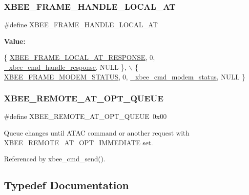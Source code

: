 \subsubsection{\texorpdfstring{X\+B\+E\+E\+\_\+\+F\+R\+A\+M\+E\+\_\+\+H\+A\+N\+D\+L\+E\+\_\+\+L\+O\+C\+A\+L\+\_\+\+AT}{XBEE\_FRAME\_HANDLE\_LOCAL\_AT}}
{\footnotesize\ttfamily \#define X\+B\+E\+E\+\_\+\+F\+R\+A\+M\+E\+\_\+\+H\+A\+N\+D\+L\+E\+\_\+\+L\+O\+C\+A\+L\+\_\+\+AT}

{\bfseries Value\+:}
\begin{DoxyCode}
\{ \hyperlink{group__xbee__device_gga7753bbebaf00d6d64942f64b6ae9b7b9ae66771334070219cd098c8201936cf4a}{XBEE\_FRAME\_LOCAL\_AT\_RESPONSE}, 0, 
      \hyperlink{group__xbee__atcmd_ga3b4559f4e729b1c96f5c0d9e4476aa7d}{\_xbee\_cmd\_handle\_response}, NULL \}, \(\backslash\)
   \{ \hyperlink{group__xbee__device_gga7753bbebaf00d6d64942f64b6ae9b7b9adff71d45371cf6b933688c43994b7f81}{XBEE\_FRAME\_MODEM\_STATUS}, 0, \hyperlink{group__xbee__atcmd_ga9b0ddf7aae7599dc334304f2b642f05f}{\_xbee\_cmd\_modem\_status}, NULL 
      \}
\end{DoxyCode}
\mbox{\label{group__xbee__atcmd_ga3ca0a18e4e629050e8f1387f72638f69}} 
\subsubsection{\texorpdfstring{X\+B\+E\+E\+\_\+\+R\+E\+M\+O\+T\+E\+\_\+\+A\+T\+\_\+\+O\+P\+T\+\_\+\+Q\+U\+E\+UE}{XBEE\_REMOTE\_AT\_OPT\_QUEUE}}
{\footnotesize\ttfamily \#define X\+B\+E\+E\+\_\+\+R\+E\+M\+O\+T\+E\+\_\+\+A\+T\+\_\+\+O\+P\+T\+\_\+\+Q\+U\+E\+UE~0x00}



Queue changes until A\+T\+AC command or another request with X\+B\+E\+E\+\_\+\+R\+E\+M\+O\+T\+E\+\_\+\+A\+T\+\_\+\+O\+P\+T\+\_\+\+I\+M\+M\+E\+D\+I\+A\+TE set. 



Referenced by xbee\+\_\+cmd\+\_\+send().



\subsection{Typedef Documentation}
\mbox{\label{group__xbee__atcmd_ga113cbd0a40a638710974218de5f885fe}} 
